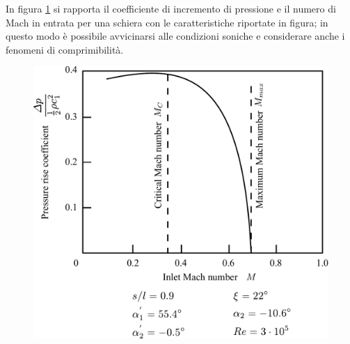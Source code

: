 In figura \ref{fig:FuoriProg2} si rapporta il coefficiente di incremento di pressione e il numero di Mach in entrata per una schiera con le caratteristiche riportate in figura; in questo modo è possibile avvicinarsi alle condizioni soniche e considerare anche i fenomeni di comprimibilità.
\begin{figure}[h!]
\centering
\begin{minipage}{.6\textwidth}
  \centering
  \includegraphics[width=.95\linewidth]{fig/FuoriProg2.pdf}
  \label{fig:FuoriProg2}
\end{minipage}%
\begin{minipage}{.4\textwidth}
  \centering

\end{minipage}
\end{figure}
